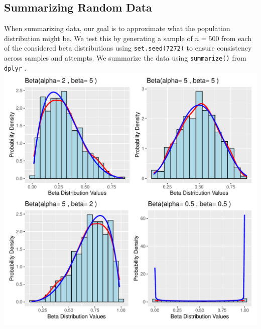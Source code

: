 \documentclass{article}\usepackage[]{graphicx}\usepackage[]{xcolor}
\makeatletter
\def\maxwidth{ %
  \ifdim\Gin@nat@width>\linewidth
    \linewidth
  \else
    \Gin@nat@width
  \fi
}
\newenvironment{knitrout}{}{} %
\makeatother
\begin{document}
\begin{multicols}{2}
\begin{table}[H]
\centering
{} %
\caption{Summary of Beta Distribution Parameters}
\end{table}

\subsection{Summarizing Random Data}
When summarizing data, our goal is to approximate what the population distribution might be. We test this by generating a sample of $n = 500$ from each of the considered beta distributions using \texttt{set.seed(7272)} to ensure consistency across samples and attempts. We summarize the data using \texttt{summarize()} from \texttt{dplyr} \citep{tidyverse}.
\begin{knitrout}\scriptsize
{}\color{fgcolor}
\includegraphics[width=\maxwidth]{figure/unnamed-chunk-2-1} 
\end{knitrout}


\end{multicols}
\end{document}

